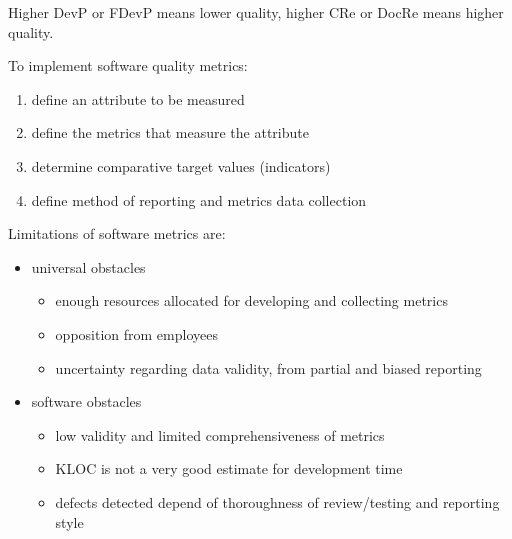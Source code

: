 \documentclass[11pt]{article}
\begin{document}
Higher DevP or FDevP means lower quality, higher CRe or DocRe means higher quality.

To implement software quality metrics:
\begin{enumerate}
\item define an attribute to be measured
\item define the metrics that measure the attribute
\item determine comparative target values (indicators)
\item define method of reporting and metrics data collection
\end{enumerate}

Limitations of software metrics are:
\begin{itemize}
\item universal obstacles
\begin{itemize}
\item enough resources allocated for developing and collecting metrics
\item opposition from employees
\item uncertainty regarding data validity, from partial and biased reporting
\end{itemize}
\item software obstacles
\begin{itemize}
\item low validity and limited comprehensiveness of metrics
\item KLOC is not a very good estimate for development time
\item defects detected depend of thoroughness of review/testing and reporting style
\end{itemize}
\end{itemize}
\end{document}

